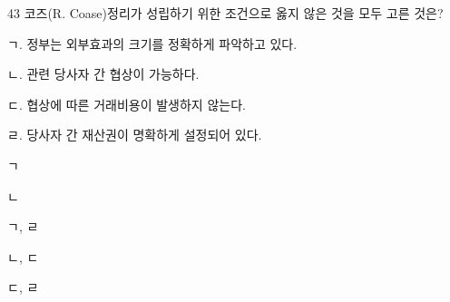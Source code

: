 \begin{question}{43}
코즈(R. Coase)정리가 성립하기 위한 조건으로 옳지 않은 것을 모두 고른 것은?
\begin{framedtext}
ㄱ. 정부는 외부효과의 크기를 정확하게 파악하고 있다. \par
ㄴ. 관련 당사자 간 협상이 가능하다. \par
ㄷ. 협상에 따른 거래비용이 발생하지 않는다. \par
ㄹ. 당사자 간 재산권이 명확하게 설정되어 있다.
\end{framedtext}
\begin{choices}
  \item ㄱ
  \item ㄴ
  \item ㄱ, ㄹ
  \item ㄴ, ㄷ
  \item ㄷ, ㄹ
\end{choices}
\end{question}
